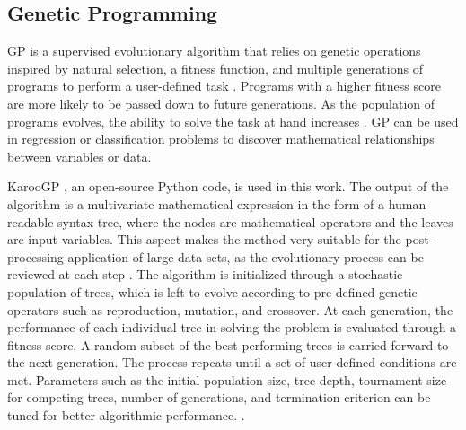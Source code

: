 \subsection*{Genetic Programming}

\ac{GP} is a supervised evolutionary algorithm \cite{koza_genetic} that relies on genetic operations inspired by natural selection, a fitness function, and multiple generations of
programs to perform a user-defined task \cite{GP_book}. Programs with a higher fitness score are more likely to be passed down to future generations. As the population of programs evolves,
the ability to solve the task at hand increases \cite{Kai_thesis}. \ac{GP} can be used in regression or classification problems to discover mathematical relationships between
variables or data. 

KarooGP \cite{KarooGP,KarooPYPI}, an open-source Python code, is used in this work. The output of the algorithm is a multivariate mathematical expression in the form of a human-readable
syntax tree, where the nodes are mathematical operators and the leaves are input variables. This aspect makes the method very suitable for the post-processing application of large data
sets, as the evolutionary process can be reviewed at each step \cite{Cavaglia_2020}. The algorithm is initialized through a stochastic population of trees, which is left to evolve according
to pre-defined genetic operators such as reproduction, mutation, and crossover. At each generation, the performance of each individual tree in solving the problem is evaluated through a
fitness score. A random subset of the best-performing trees is carried forward to the next generation. The process repeats until a set of user-defined conditions are met. Parameters such as
the initial population size, tree depth, tournament size for competing trees, number of generations, and termination criterion can be tuned for better algorithmic performance.
.


 


